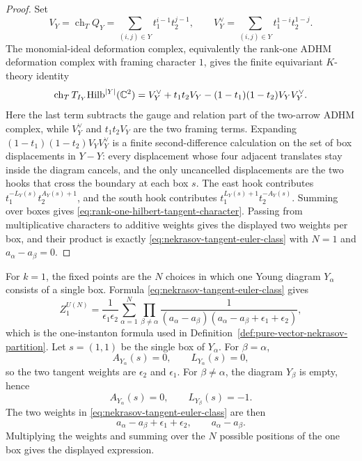 \begin{proof}
Set
\[
  V_Y=\operatorname{ch}_{T}Q_Y
  =
  \sum_{(i,j)\in Y}t_1^{i-1}t_2^{j-1},
  \qquad
  V_Y^\vee=\sum_{(i,j)\in Y}t_1^{1-i}t_2^{1-j}.
\]
The monomial-ideal deformation complex, equivalently the rank-one ADHM
deformation complex with framing character \(1\), gives the finite
equivariant \(K\)-theory identity
\begin{equation}
  \operatorname{ch}_{T}T_{I_Y}{\rm Hilb}^{|Y|}(\mathbb C^2)
  =
  V_Y^\vee+t_1t_2V_Y-(1-t_1)(1-t_2)V_YV_Y^\vee .
  \label{eq:rank-one-hilbert-k-character}
\end{equation}
Here the last term subtracts the gauge and relation part of the two-arrow
ADHM complex, while \(V_Y^\vee\) and \(t_1t_2V_Y\) are the two framing
terms.  Expanding \((1-t_1)(1-t_2)V_YV_Y^\vee\) is a finite second-difference
calculation on the set of box displacements in \(Y-Y\): every displacement
whose four adjacent translates stay inside the diagram cancels, and the only
uncancelled displacements are the two hooks that cross the boundary at each
box \(s\).  The east hook contributes
\(t_1^{-L_Y(s)}t_2^{A_Y(s)+1}\), and the south hook contributes
\(t_1^{L_Y(s)+1}t_2^{-A_Y(s)}\).  Summing over boxes gives
\eqref{eq:rank-one-hilbert-tangent-character}.  Passing from multiplicative
characters to additive weights gives the displayed two weights per box, and
their product is exactly \eqref{eq:nekrasov-tangent-euler-class} with
\(N=1\) and \(a_\alpha-a_\beta=0\).
\end{proof}

For \(k=1\), the fixed points are the \(N\) choices in which one Young
diagram \(Y_\alpha\) consists of a single box.  Formula
\eqref{eq:nekrasov-tangent-euler-class} gives
\[
  Z_1^{U(N)}
  =
  \frac1{\epsilon_1\epsilon_2}
  \sum_{\alpha=1}^{N}
  \prod_{\beta\ne\alpha}
  \frac1{(a_\alpha-a_\beta)
  (a_\alpha-a_\beta+\epsilon_1+\epsilon_2)} ,
\]
which is the one-instanton formula used in
Definition~\ref{def:pure-vector-nekrasov-partition}.
Let \(s=(1,1)\) be the single box of \(Y_\alpha\).  For \(\beta=\alpha\),
\[
  A_{Y_\alpha}(s)=0,\qquad L_{Y_\alpha}(s)=0,
\]
so the two tangent weights are \(\epsilon_2\) and \(\epsilon_1\).  For
\(\beta\ne\alpha\), the diagram \(Y_\beta\) is empty, hence
\[
  A_{Y_\alpha}(s)=0,\qquad L_{Y_\beta}(s)=-1.
\]
The two weights in \eqref{eq:nekrasov-tangent-euler-class} are then
\[
  a_\alpha-a_\beta+\epsilon_1+\epsilon_2,
  \qquad
  a_\alpha-a_\beta .
\]
Multiplying the weights and summing over the \(N\) possible positions of the
one box gives the displayed expression.

